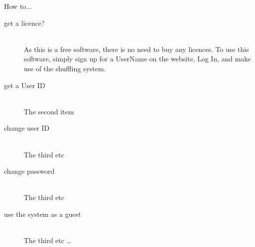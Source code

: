 How to...

\begin{description}
 	\item[get a licence?] \hfill \\
 		As this is a free software, there is no need to buy any licences. To use this software, simply 
		sign up for a UserName on the website, Log In, and make use of the shuffling system.
 	\item[get a User ID] \hfill \\
		 The second item
 	\item[change user ID] \hfill \\
 		The third etc 
	\item[change password] \hfill \\
 		The third etc 
	\item[use the system as a guest] \hfill \\
 		The third etc \ldots
\end{description}